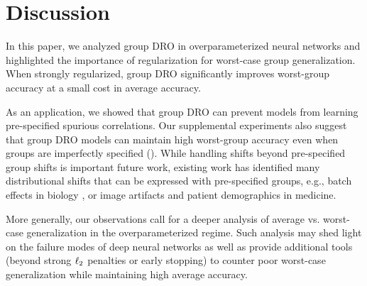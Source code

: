 \section{Discussion}\label{sec:discussion}
In this paper, we analyzed group DRO in overparameterized neural networks and highlighted the importance of regularization for worst-case group generalization.
When strongly regularized,
group DRO significantly improves worst-group accuracy at a small cost in average accuracy.

As an application, we showed that group DRO can prevent models from learning pre-specified spurious correlations.
Our supplemental experiments also suggest that group DRO models can maintain high worst-group accuracy even when groups are imperfectly specified ().
While handling shifts beyond pre-specified group shifts is important future work, existing work has identified many distributional shifts
that can be expressed with pre-specified groups, e.g., batch effects in biology \citep{leek2010tackling}, or image artifacts \citep{oakden2019hidden} and patient demographics \citep{badgeley2019deep} in medicine.

More generally, our observations
call for a deeper analysis of average vs. worst-case generalization in the overparameterized regime.
Such analysis may shed light on the failure modes of deep neural networks as well as provide additional tools (beyond strong $\ell_2$ penalties or early stopping) to counter poor worst-case generalization while maintaining high average accuracy.
